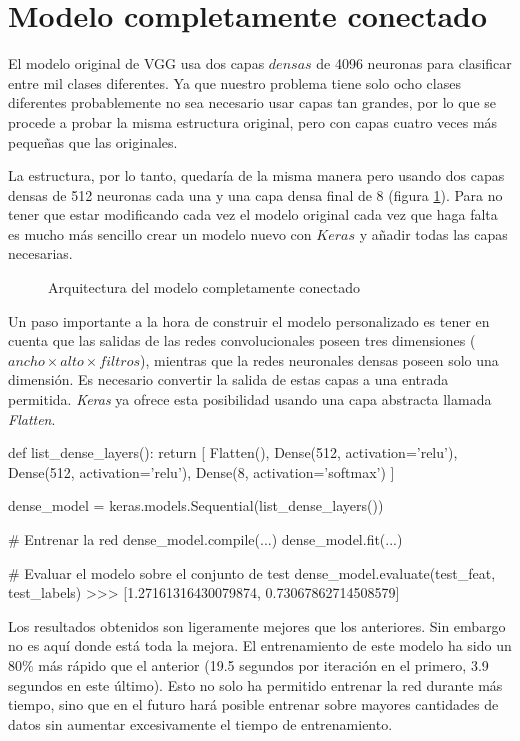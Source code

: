 \section{Modelo completamente conectado}
\label{sec:model_connected}

El modelo original de VGG usa dos capas $densas$ de 4096 neuronas para
clasificar entre mil clases diferentes. Ya que nuestro problema tiene solo ocho
clases diferentes probablemente no sea necesario usar capas tan grandes, por lo
que se procede a probar la misma estructura original, pero con capas cuatro
veces más pequeñas que las originales.

La estructura, por lo tanto, quedaría de la misma manera pero usando dos capas
densas de 512 neuronas cada una y una capa densa final de 8 (figura
\ref{standard_arch}). Para no tener que estar modificando cada vez el modelo
original cada vez que haga falta es mucho más sencillo crear un modelo nuevo
con $Keras$ y añadir todas las capas necesarias.

\begin{figure}
  \caption{Arquitectura del modelo completamente conectado}
\label{standard_arch}
\end{figure}

Un paso importante a la hora de construir el modelo personalizado es tener en cuenta que las salidas de las redes convolucionales poseen tres dimensiones ($ancho \times alto \times filtros$), mientras que la redes neuronales densas poseen solo una dimensión. Es necesario convertir la salida de estas capas a una entrada permitida. \textit{Keras} ya ofrece esta posibilidad usando una capa abstracta llamada \textit{Flatten}.

\begin{python}
def list_dense_layers():
    return [
        Flatten(),
        Dense(512, activation='relu'),
        Dense(512, activation='relu'),
        Dense(8, activation='softmax')
    ]

dense_model = keras.models.Sequential(list_dense_layers())

# Entrenar la red
dense_model.compile(...)
dense_model.fit(...)

# Evaluar el modelo sobre el conjunto de test
dense_model.evaluate(test_feat, test_labels)
>>> [1.27161316430079874, 0.73067862714508579]
\end{python}

Los resultados obtenidos son ligeramente mejores que los anteriores. Sin
embargo no es aquí donde está toda la mejora. El entrenamiento de este modelo
ha sido un 80\% más rápido que el anterior (19.5 segundos por iteración en el
primero, 3.9 segundos en este último). Esto no solo ha permitido entrenar la
red durante más tiempo, sino que en el futuro hará posible entrenar sobre
mayores cantidades de datos sin aumentar excesivamente el tiempo de entrenamiento.

